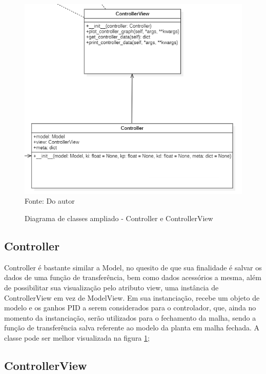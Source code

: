 \begin{figure}[H]
    \centering
    \caption{Diagrama de classes ampliado - Controller e ControllerView}
    \includegraphics[scale=0.7]{figuras/class_diag_controller}
    \label{fig:class_diag_controller}
    \\
    \vspace{0cm}\hspace{0cm}\small{Fonte: Do autor}
\end{figure}

\subsection{Controller}

Controller é bastante similar a Model, no quesito de que sua finalidade é salvar os dados de uma função de
transferência, bem como dados acessórios a mesma, além de possibilitar sua visualização pelo atributo view, uma
instância de ControllerView em vez de ModelView.
Em sua instanciação, recebe um objeto de modelo e os ganhos PID a serem considerados para o controlador, que, ainda no
momento da instanciação, serão utilizados para o fechamento da malha, sendo a função de transferência salva referente
ao modelo da planta em malha fechada.
A classe pode ser melhor visualizada na figura \ref{fig:class_diag_controller};

\subsection{ControllerView}


